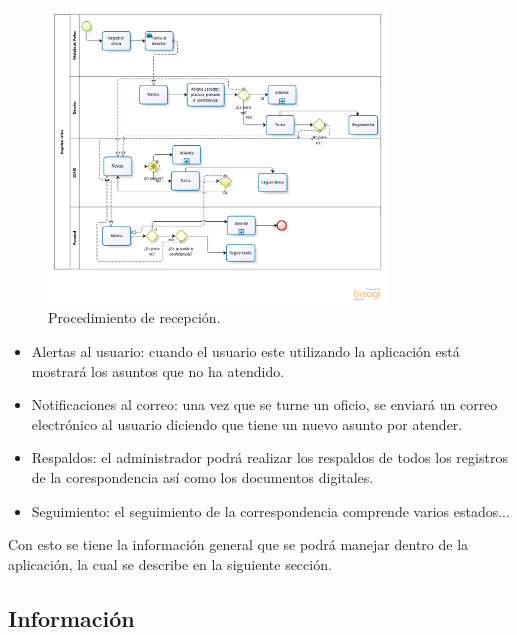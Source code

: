 \begin{figure}[htbp!]
		\centering
			\includegraphics[width=0.8\textwidth]{images/propuesta/registrooficio}
		\caption{Procedimiento de recepción.}
		\label{Registro oficio}
	\end{figure}
	
\begin{itemize}
	\item Alertas al usuario: cuando el usuario este utilizando la aplicación está mostrará los asuntos que no ha atendido. 
	\item Notificaciones al correo: una vez que se turne un oficio, se enviará un correo electrónico al usuario diciendo que tiene un nuevo asunto por atender. 
	\item Respaldos: el administrador podrá realizar los respaldos de todos los registros de la corespondencia así como los documentos digitales.
	\item Seguimiento: el seguimiento de la correspondencia comprende varios estados...
\end{itemize}

Con esto se tiene la información general que se podrá manejar dentro de la aplicación, la cual se describe en la siguiente sección.

\subsection{Información}

